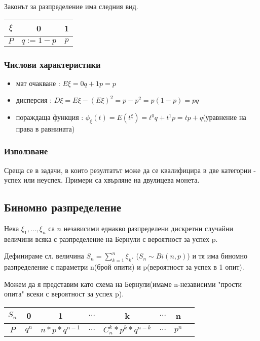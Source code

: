\documentclass[fleqn,12pt]{article}
\begin{document}
\begin{justify}
Законът за разпределение има следния вид.
\begin{tabular}{|c|c|c|}
    \hline
    $\xi$ & 0 & 1 \\
    \hline
    $P$ & $q := 1 - p$ & $p$ \\
    \hline
\end{tabular}

\subsubsection{Числови характеристики} 
\begin{itemize}
    \item мат очакване : $E\xi = 0q + 1p = p$
    \item дисперсия : $D\xi = E\xi - (E\xi)^2 = p - p^2 = p(1-p)  = pq$
    \item пораждаща функция : $\phi_\xi(t) = E(t^\xi) = t^0q + t^1p = tp + q$(уравнение на права в равнината)
\end{itemize}

\subsubsection{Използване} 
Среща се в задачи, в които резултатът може да се квалифицира в две категории - успех или неуспех. Примери са хвърляне 
на двулицева монета.

\subsection{Биномно разпределение}
Нека $\xi_1, \dots, \xi_n$ са $n$ независими еднакво разпределени дискретни случайни величини всяка с разпределение на 
Бернули с вероятност за успех p.

Дефинираме сл. величина $S_n = \sum_{k=1}^n \xi_k$. ($S_n \sim Bi(n,p)$) и тя има биномно разпределение с параметри n(брой
опити) и p(вероятност за успех в 1 опит).

Можем да я представим като схема на Бернули(имаме n-независими "прости опита" всеки с вероятност за успех p).

\begin{tabular}{|c|c|c|c|c|c|c|c|}
    \hline
    $S_n$ & 0 & 1 & $\dots$ & k & $\dots$ & n \\
    \hline
    $P$ & $q^n$ & $n*p*q^{n-1}$ & $\dots$ & $C_n^k * p^k * q^{n-k}$ & $\dots$ & $p^n$ \\
    \hline
\end{tabular}


\end{justify}
\end{document}

